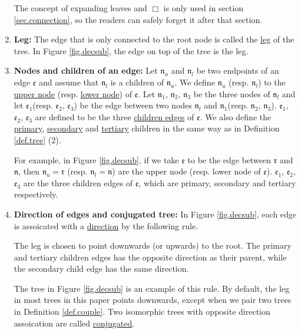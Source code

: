 \begin{defn}
\begin{enumerate}
    The concept of expanding leaves and $\Box$ is only used in section \ref{sec.connection}, so the readers can safely forget it after that section.

    \item \textbf{Leg:} The edge that is only connected to the root node is called the \underline{leg} of the tree. In Figure \ref{fig.decsub}, the edge on top of the tree is the leg.
    
    \item \textbf{Nodes and children of an edge:} Let $\mathfrak{n}_{u}$ and $\mathfrak{n}_{l}$ be two endpoints of an edge $\mathfrak{e}$ and assume that $\mathfrak{n}_{l}$ is a children of $\mathfrak{n}_{u}$. We define $\mathfrak{n}_{u}$ (resp. $\mathfrak{n}_{l}$) to the \underline{upper node} (resp. \underline{lower node}) of $\mathfrak{e}$. Let $\mathfrak{n}_1$, $\mathfrak{n}_2$, $\mathfrak{n}_3$ be the three nodes of $\mathfrak{n}_{l}$ and let $\mathfrak{e}_1$(resp. $\mathfrak{e}_2$, $\mathfrak{e}_3$) be the edge between two nodes $\mathfrak{n}_{l}$ and $\mathfrak{n}_1$(resp. $\mathfrak{n}_2$, $\mathfrak{n}_3$). $\mathfrak{e}_1$, $\mathfrak{e}_2$, $\mathfrak{e}_3$ are defined to be the three \underline{children edges} of $\mathfrak{e}$. We also define the \underline{primary}, \underline{secondary} and \underline{tertiary} children in the same way as in Definition \ref{def.tree} (2).
    
    For example, in Figure \ref{fig.decsub}, if we take $\mathfrak{e}$ to be the edge between $\mathfrak{r}$ and $\mathfrak{n}$, then $\mathfrak{n}_{u} = \mathfrak{r}$  (resp. $\mathfrak{n}_{l} = \mathfrak{n}$) are the upper node (resp. lower node of $\mathfrak{e}$). $\mathfrak{e}_1$, $\mathfrak{e}_2$, $\mathfrak{e}_3$ are the three children edges of $\mathfrak{e}$, which are primary, secondary and tertiary respectively.

    \item \textbf{Direction of edges and conjugated tree:} In Figure \ref{fig.decsub}, each edge is assoicated with a \underline{direction} by the following rule. 
    
    The leg is chosen to point downwards (or upwards) to the root. The primary and tertiary children edges has the opposite direction as their parent, while the secondary child edge has the same direction.

    The tree in Figure \ref{fig.decsub} is an example of this rule. By default, the leg in most trees in this paper points downwards, except when we pair two trees in Definition \ref{def.couple}. Two isomorphic trees with opposite direction assoication are called \underline{conjugated}.


\end{enumerate}
\end{defn}
